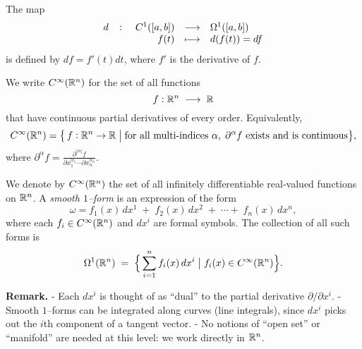 \documentclass[11pt,openany]{article}
\begin{document}
The map \[
\fullfunction{d}{C^1([a,b])}{\Omega^1([a,b])}{f(t)}{d(f(t))=df}
\] is defined by $df=f'(t)dt$, where $f'$ is the derivative of $f$.


\begin{definition}
	We write \(C^\infty(\mathbb{R}^n)\) for the set of all functions
	\[
	f:\mathbb{R}^n\;\longrightarrow\;\mathbb{R}
	\]
	that have continuous partial derivatives of every order.  Equivalently,
	\[
	C^\infty(\mathbb{R}^n)
	=\bigl\{\,f:\mathbb{R}^n\to\mathbb{R}\;\big|\;
	\text{for all multi‐indices }\alpha,\;
	\partial^\alpha f\text{ exists and is continuous}\bigr\},
	\]
	where \(\partial^\alpha f = \frac{\partial^{|\alpha|}f}{\partial x_1^{\alpha_1}\cdots\partial x_n^{\alpha_n}}\).
\end{definition}

\begin{definition}
	We denote by \(C^\infty(\mathbb{R}^n)\) the set of all infinitely differentiable real‐valued functions on \(\mathbb{R}^n\).  A \emph{smooth \(1\)–form} is an expression of the form
	\[
	\omega
	= f_1(x)\,dx^1 \;+\; f_2(x)\,dx^2 \;+\;\cdots+\; f_n(x)\,dx^n,
	\]
	where each \(f_i\in C^\infty(\mathbb{R}^n)\) and \(dx^i\) are formal symbols.  The collection of all such forms is
	\[
	\Omega^1(\mathbb{R}^n)
	\;=\;
	\Bigl\{\,
	\sum_{i=1}^n f_i(x)\,dx^i
	\;\big|\;
	f_i(x)\in C^\infty(\mathbb{R}^n)
	\Bigr\}.
	\]
\end{definition}

\noindent\textbf{Remark.}  
- Each \(dx^i\) is thought of as “dual” to the partial derivative \(\partial/\partial x^i\).  
- Smooth \(1\)–forms can be integrated along curves (line integrals), since \(dx^i\) picks out the \(i\)th component of a tangent vector.  
- No notions of “open set” or “manifold” are needed at this level: we work directly in \(\mathbb{R}^n\).

\end{document}
